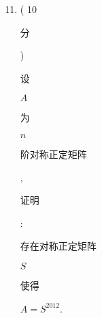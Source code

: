 \documentclass[10pt]{article}
\begin{document}
\begin{enumerate}
  \setcounter{enumi}{10}
  \item ( 10 \begin{CJK}{UTF8}{mj}分\end{CJK}) \begin{CJK}{UTF8}{mj}设\end{CJK} $A$ \begin{CJK}{UTF8}{mj}为\end{CJK} $n$ \begin{CJK}{UTF8}{mj}阶对称正定矩阵\end{CJK}, \begin{CJK}{UTF8}{mj}证明\end{CJK}: \begin{CJK}{UTF8}{mj}存在对称正定矩阵\end{CJK} $S$ \begin{CJK}{UTF8}{mj}使得\end{CJK} $A=S^{2012}$.
\end{enumerate}
\end{document}
